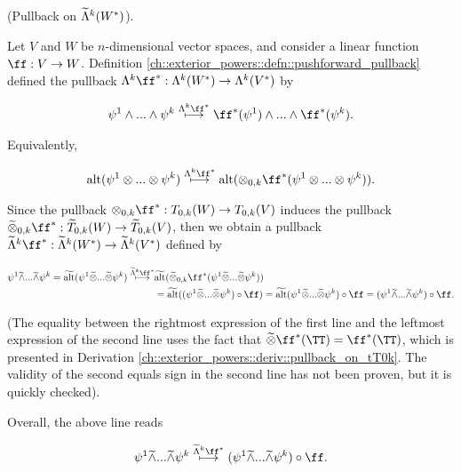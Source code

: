 \begin{deriv}
\label{ch::exterior_powers::deriv::pullback_on_exterior_pwr_of_actual_fns}
    (Pullback on $\widetilde{\Lambda}^k(W^*)$).
    
    Let $V$ and $W$ be $n$-dimensional vector spaces, and consider a linear function $\ff:V \rightarrow W$. Definition \ref{ch::exterior_powers::defn::pushforward_pullback} defined the pullback $\Lambda^k \ff^*:\Lambda^k(W^*) \rightarrow \Lambda^k(V^*)$ by
    
    \begin{align*}
        \psi^1 \wedge ... \wedge \psi^k \overset{\Lambda^k \ff^*}{\longmapsto} \ff^*(\psi^1) \wedge ... \wedge \ff^*(\psi^k).
    \end{align*}
    
    Equivalently,
    
    \begin{align*}
        \alt(\psi^1 \otimes ... \otimes \psi^k) \overset{\Lambda^k \ff^*}{\longmapsto} \alt(\otimes_{0, k} \ff^*(\psi^1 \otimes ... \otimes \psi^k)).
    \end{align*}
    
    Since the pullback $\otimes_{0, k} \ff^*:T_{0,k}(W) \rightarrow T_{0,k}(V)$ induces the pullback $\totimes_{0,k} \ff^*:\tT_{0,k}(W) \rightarrow \tT_{0,k}(V)$, then we obtain a pullback $\tLambda^k \ff^*:\tLambda^k(W^*) \rightarrow \tLambda^k(V^*)$ defined by
    
    \begin{align*}
        \psi^1 \twedge ... \twedge \psi^k = \talt(\psi^1 \totimes ... \totimes \psi^k) \overset{\tLambda^k \ff^*}{\longmapsto}
        &\talt(\totimes_{0,k} \ff^*(\psi^1 \totimes ... \totimes \psi^k)) \\ 
        &= \talt((\psi^1 \totimes ... \totimes \psi^k) \circ \ff) = \talt(\psi^1 \totimes ... \totimes \psi^k) \circ \ff
        = (\psi^1 \twedge ... \twedge \psi^k) \circ \ff.
    \end{align*}
    
    (The equality between the rightmost expression of the first line and the leftmost expression of the second line uses the fact that $\totimes \ff^*(\TT) = \ff^*(\TT)$, which is presented in Derivation \ref{ch::exterior_powers::deriv::pullback_on_tT0k}. The validity of the second equals sign in the second line has not been proven, but it is quickly checked).
    
    Overall, the above line reads
    
    \begin{align*}
        \psi^1 \twedge ... \twedge \psi^k \overset{\tLambda^k \ff^*}{\longmapsto} (\psi^1 \twedge ... \twedge \psi^k) \circ \ff.
    \end{align*}
    

\end{deriv}
